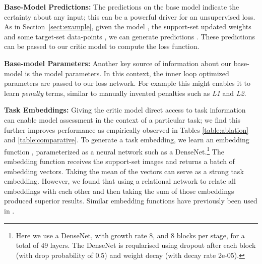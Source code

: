 \documentclass{article} \usepackage[dvipsnames]{xcolor}
\begin{document}
\textbf{Base-Model Predictions:}
The predictions on the base model indicate the certainty about any input; this can be a powerful driver for an unsupervised loss. As in Section~\ref{sect:example}, given the model , the support-set updated weights  and some target-set data-points , we can generate predictions . These predictions can be passed to our critic model  to compute the loss function.

\textbf{Base-model Parameters:}
Another key source of information about our base-model is the model parameters. In this context, the inner loop optimized parameters  are passed to our loss network. For example this might enables it to learn \emph{penalty} terms, similar to manually invented penalties such as \emph{L1} and \emph{L2}.

\textbf{Task Embeddings:}\label{task-embedding-conditioning}
Giving the critic model direct access to task information can enable model assessment in the context of a particular task; we find this further improves performance as empirically observed in Tables \ref{table:ablation} and \ref{table:comparative}. To generate a task embedding, we learn an embedding function , parameterized as a neural network such as a DenseNet.\footnote{Here we use a DenseNet, with growth rate 8, and 8 blocks per stage, for a total of 49 layers. The DenseNet is reqularised using dropout after each block (with drop probability of 0.5) and weight decay (with decay rate 2e-05).} The embedding function  receives the support-set images and returns a batch of embedding vectors. Taking the mean of the vectors can serve as a strong task embedding. However, we found that using a relational network to relate all embeddings with each other and then taking the sum of those embeddings produced superior results. Similar embedding functions have previously been used in \citep{rusu2018meta}. 
\end{document}
